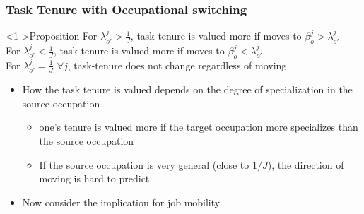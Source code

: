 \documentclass[11pt]{beamer}
\begin{document}




\begin{frame}
	\frametitle{Task Tenure with Occupational switching}
	
	\begin{block}<1->{Proposition}
		For $\lambda_{o'}^j>\frac{1}{J}$, task-tenure is valued more if moves to $\beta_o^j > \lambda_{o'}^j$\\
		For $\lambda_{o'}^j<\frac{1}{J}$, task-tenure is valued more if moves to $\beta_o^j < \lambda_{o'}^j$\\
		For $\lambda_{o'}^j = \frac{1}{J}$ $\forall j$, task-tenure does not change regardless of moving
	\end{block}
	\begin{itemize}
		\item How the task tenure is valued depends on the degree of specialization in the source occupation
		\begin{itemize}
			\item one's tenure is valued more if the target occupation more specializes than the source occupation
			\item If the source occupation is very general (close to $1/J$), the direction of moving is hard to predict 
		\end{itemize}
		\item Now consider the implication for job mobility
	\end{itemize}
\end{frame}
\end{document}
